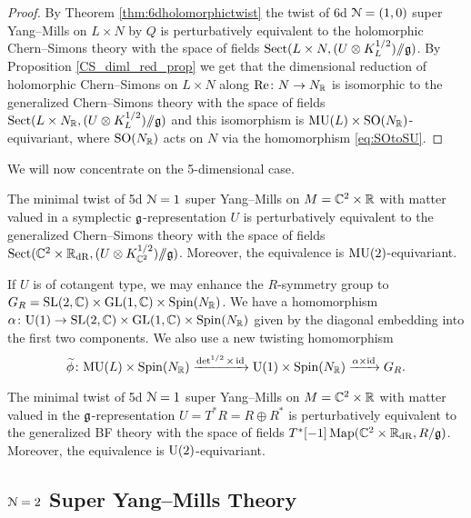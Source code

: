 \documentclass[10pt, oneside]{article}
\begin{document}
\begin{proof}
By Theorem \ref{thm:6dholomorphictwist} the twist of 6d $\mathcal N=(1, 0)$ super Yang--Mills on $L\times N$ by $Q$ is perturbatively equivalent to the holomorphic Chern--Simons theory with the space of fields $\mathrm{Sect}(L\times N, (U\otimes K_L^{1/2})/\!\!/ \mathfrak g)$. By Proposition \ref{CS_diml_red_prop} we get that the dimensional reduction of holomorphic Chern--Simons on $L\times N$ along $\mathrm{Re}\colon N\rightarrow N_\mathbb R$ is isomorphic to the generalized Chern--Simons theory with the space of fields $\mathrm{Sect}(L\times N_\mathbb R, (U\otimes K_L^{1/2})/\!\!/\mathfrak g)$ and this isomorphism is $\mathrm{MU}(L)\times \mathrm{SO}(N_\mathbb R)$-equivariant, where $\mathrm{SO}(N_\mathbb R)$ acts on $N$ via the homomorphism \eqref{eq:SOtoSU}.
\end{proof}

We will now concentrate on the 5-dimensional case.

\begin{theorem}
The minimal twist of 5d $\mathcal N=1$ super Yang--Mills on $M=\mathbb C^2\times \mathbb R$ with matter valued in a symplectic $\mathfrak g$-representation $U$ is perturbatively equivalent to the generalized Chern--Simons theory with the space of fields $\mathrm{Sect}(\mathbb C^2\times \mathbb R_{\mathrm{dR}}, (U\otimes K_{\mathbb C^2}^{1/2})/\!\!/ \mathfrak g)$. Moreover, the equivalence is $\mathrm{MU}(2)$-equivariant.
\label{thm:5dminimaltwist}
\end{theorem}

If $U$ is of cotangent type, we may enhance the $R$-symmetry group to $G_R=\mathrm{SL}(2, \mathbb C)\times \mathrm{GL}(1, \mathbb C)\times \mathrm{Spin}(N_\mathbb R)$. We have a homomorphism $\alpha\colon \mathrm{U}(1)\rightarrow \mathrm{SL}(2, \mathbb C)\times \mathrm{GL}(1, \mathbb C)\times \mathrm{Spin}(N_\mathbb R)$ given by the diagonal embedding into the first two components. We also use a new twisting homomorphism
\[\widetilde{\phi}\colon \mathrm{MU}(L)\times \mathrm{Spin}(N_\mathbb R)\xrightarrow{\det^{1/2}\times \operatorname{id}}\mathrm{U}(1)\times \mathrm{Spin}(N_\mathbb R)\xrightarrow{\alpha\times\operatorname{id}}G_R.\]

\begin{theorem}
The minimal twist of 5d $\mathcal N=1$ super Yang--Mills on $M=\mathbb C^2\times \mathbb R$ with matter valued in the $\mathfrak g$-representation $U=T^* R=R\oplus R^*$ is perturbatively equivalent to the generalized BF theory with the space of fields $T^*[-1]\operatorname{Map}(\mathbb C^2\times \mathbb R_{\mathrm{dR}}, R/\mathfrak g)$. Moreover, the equivalence is $\mathrm{U}(2)$-equivariant.
\label{thm:5dminimaltwistgraded}
\end{theorem}

\subsection{\texorpdfstring{$\mathcal{N} = 2$}{N=2} Super Yang--Mills Theory} \label{5d_2_section}
\end{document}

